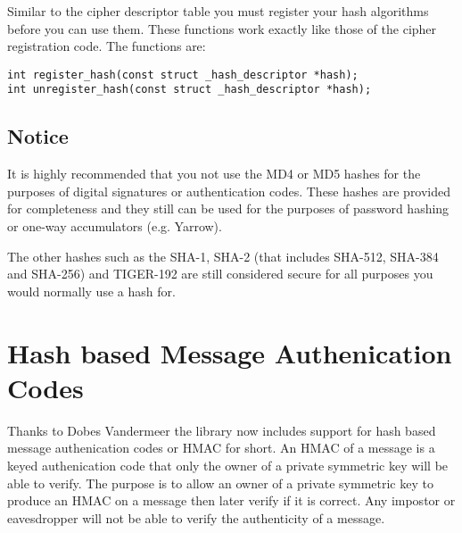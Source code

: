 \documentclass{book}
\begin{document}
Similar to the cipher descriptor table you must register your hash algorithms before you can use them.  These functions
work exactly like those of the cipher registration code.  The functions are:
\begin{verbatim}
int register_hash(const struct _hash_descriptor *hash);
int unregister_hash(const struct _hash_descriptor *hash);
\end{verbatim}

\subsection{Notice}
It is highly recommended that you not use the MD4 or MD5 hashes for the purposes of digital signatures or authentication codes.  
These hashes are provided for completeness and they still can be used for the purposes of password hashing or one-way accumulators
(e.g. Yarrow).

The other hashes such as the SHA-1, SHA-2 (that includes SHA-512, SHA-384 and SHA-256) and TIGER-192 are still considered secure
for all purposes you would normally use a hash for.

\section{Hash based Message Authenication Codes}
Thanks to Dobes Vandermeer the library now includes support for hash based message authenication codes or HMAC for short.  An HMAC
of a message is a keyed authenication code that only the owner of a private symmetric key will be able to verify.  The purpose is
to allow an owner of a private symmetric key to produce an HMAC on a message then later verify if it is correct.  Any impostor or
eavesdropper will not be able to verify the authenticity of a message.  
\end{document}
